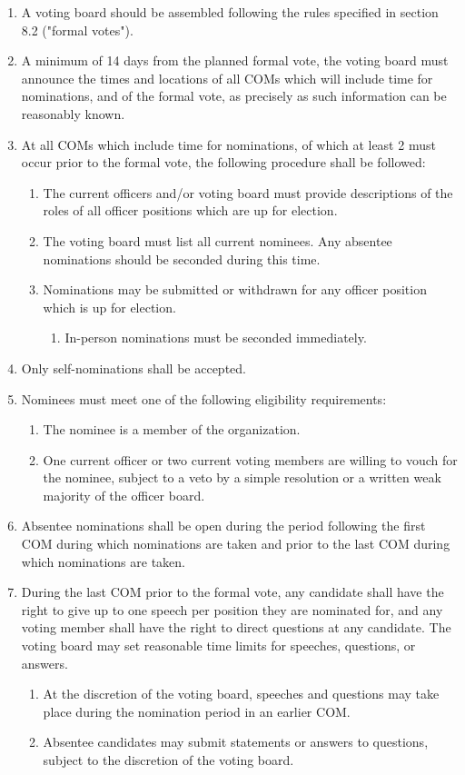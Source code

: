 \documentclass[11pt]{article}
\newcounter{h1}
\newcounter{h2}[h1]
\newcounter{h3}[h2]
\begin{document}
\begin{enumerate}
  \item A voting board should be assembled following the rules specified in section 8.2 ("formal votes").
  \item A minimum of 14 days from the planned formal vote, the voting board must announce the times and locations of all COMs which will include time for nominations, and of the formal vote, as precisely as such information can be reasonably known.
  \item At all COMs which include time for nominations, of which at least 2 must occur prior to the formal vote, the following procedure shall be followed:
  \begin{enumerate}
    \item The current officers and/or voting board must provide descriptions of the roles of all officer positions which are up for election.
    \item The voting board must list all current nominees. Any absentee nominations should be seconded during this time.
    \item Nominations may be submitted or withdrawn for any officer position which is up for election.
    \begin{enumerate}
      \item In-person nominations must be seconded immediately.
    \end{enumerate}
  \end{enumerate}
  \item Only self-nominations shall be accepted.
  \item Nominees must meet one of the following eligibility requirements:
  \begin{enumerate}
    \item The nominee is a member of the organization.
    \item One current officer or two current voting members are willing to vouch for the nominee, subject to a veto by a simple resolution or a written weak majority of the officer board.
  \end{enumerate}
  \item Absentee nominations shall be open during the period following the first COM during which nominations are taken and prior to the last COM during which nominations are taken.
  \item During the last COM prior to the formal vote, any candidate shall have the right to give up to one speech per position they are nominated for, and any voting member shall have the right to direct questions at any candidate. The voting board may set reasonable time limits for speeches, questions, or answers.
  \begin{enumerate}
    \item At the discretion of the voting board, speeches and questions may take place during the nomination period in an earlier COM.
    \item Absentee candidates may submit statements or answers to questions, subject to the discretion of the voting board.
  \end{enumerate}
\end{enumerate}
\end{document}
